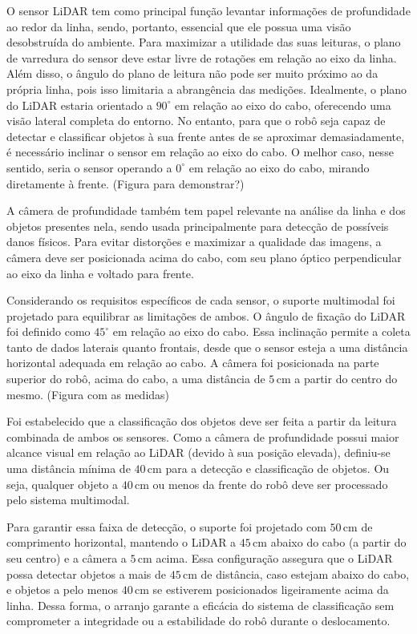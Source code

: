O sensor LiDAR tem como principal função levantar informações de profundidade ao redor da linha, sendo, portanto, essencial que ele possua uma visão desobstruída do ambiente. Para maximizar a utilidade das suas leituras, o plano de varredura do sensor deve estar livre de rotações em relação ao eixo da linha. Além disso, o ângulo do plano de leitura não pode ser muito próximo ao da própria linha, pois isso limitaria a abrangência das medições. Idealmente, o plano do LiDAR estaria orientado a $90^\circ$ em relação ao eixo do cabo, oferecendo uma visão lateral completa do entorno. No entanto, para que o robô seja capaz de detectar e classificar objetos à sua frente antes de se aproximar demasiadamente, é necessário inclinar o sensor em relação ao eixo do cabo. O melhor caso, nesse sentido, seria o sensor operando a $0^\circ$ em relação ao eixo do cabo, mirando diretamente à frente. (Figura para demonstrar?)

A câmera de profundidade também tem papel relevante na análise da linha e dos objetos presentes nela, sendo usada principalmente para detecção de possíveis danos físicos. Para evitar distorções e maximizar a qualidade das imagens, a câmera deve ser posicionada acima do cabo, com seu plano óptico perpendicular ao eixo da linha e voltado para frente.

Considerando os requisitos específicos de cada sensor, o suporte multimodal foi projetado para equilibrar as limitações de ambos. O ângulo de fixação do LiDAR foi definido como $45^\circ$ em relação ao eixo do cabo. Essa inclinação permite a coleta tanto de dados laterais quanto frontais, desde que o sensor esteja a uma distância horizontal adequada em relação ao cabo. A câmera foi posicionada na parte superior do robô, acima do cabo, a uma distância de $5\,\text{cm}$ a partir do centro do mesmo. (Figura com as medidas)

Foi estabelecido que a classificação dos objetos deve ser feita a partir da leitura combinada de ambos os sensores. Como a câmera de profundidade possui maior alcance visual em relação ao LiDAR (devido à sua posição elevada), definiu-se uma distância mínima de $40\,\text{cm}$ para a detecção e classificação de objetos. Ou seja, qualquer objeto a $40\,\text{cm}$ ou menos da frente do robô deve ser processado pelo sistema multimodal.

Para garantir essa faixa de detecção, o suporte foi projetado com $50\,\text{cm}$ de comprimento horizontal, mantendo o LiDAR a $45\,\text{cm}$ abaixo do cabo (a partir do seu centro) e a câmera a $5\,\text{cm}$ acima. Essa configuração assegura que o LiDAR possa detectar objetos a mais de $45\,\text{cm}$ de distância, caso estejam abaixo do cabo, e objetos a pelo menos $40\,\text{cm}$ se estiverem posicionados ligeiramente acima da linha. Dessa forma, o arranjo garante a eficácia do sistema de classificação sem comprometer a integridade ou a estabilidade do robô durante o deslocamento.

